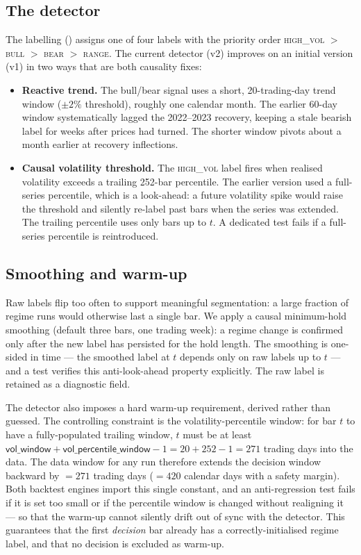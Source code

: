 \subsection{The detector}

The labelling () assigns one of four labels with the
priority order \textsc{high\_vol} $>$ \textsc{bull} $>$ \textsc{bear} $>$ \textsc{range}.
The current detector (v2) improves on an initial version (v1) in two ways that are both
causality fixes:
\begin{itemize}
  \item \textbf{Reactive trend.} The bull/bear signal uses a short, 20-trading-day trend
  window ($\pm 2\%$ threshold), roughly one calendar month. The earlier 60-day window
  systematically lagged the 2022--2023 recovery, keeping a stale bearish label for weeks
  after prices had turned. The shorter window pivots about a month earlier at recovery
  inflections.
  \item \textbf{Causal volatility threshold.} The \textsc{high\_vol} label fires when
  realised volatility exceeds a trailing 252-bar percentile. The earlier version used a
  full-series percentile, which is a look-ahead: a future volatility spike would raise the
  threshold and silently re-label past bars when the series was extended. The trailing
  percentile uses only bars up to $t$. A dedicated test fails if a full-series percentile is
  reintroduced.
\end{itemize}

\subsection{Smoothing and warm-up}

Raw labels flip too often to support meaningful segmentation: a large fraction of regime
runs would otherwise last a single bar. We apply a causal minimum-hold smoothing (default
three bars, one trading week): a regime change is confirmed only after the new label has
persisted for the hold length. The smoothing is one-sided in time --- the smoothed label at
$t$ depends only on raw labels up to $t$ --- and a test verifies this anti-look-ahead
property explicitly. The raw label is retained as a diagnostic field.

The detector also imposes a hard warm-up requirement, derived rather than guessed. The
controlling constraint is the volatility-percentile window: for bar $t$ to have a
fully-populated trailing window, $t$ must be at least
$\textsf{vol\_window} + \textsf{vol\_percentile\_window} - 1 = 20 + 252 - 1 = 271$ trading
days into the data. The data window for any run therefore extends the decision window
backward by ${}=271$ trading days
(${}=420$ calendar days with a safety margin). Both
backtest engines import this single constant, and an anti-regression test fails if it is set
too small or if the percentile window is changed without realigning it --- so that the
warm-up cannot silently drift out of sync with the detector. This guarantees that the first
\emph{decision} bar already has a correctly-initialised regime label, and that no decision
is excluded as warm-up.

